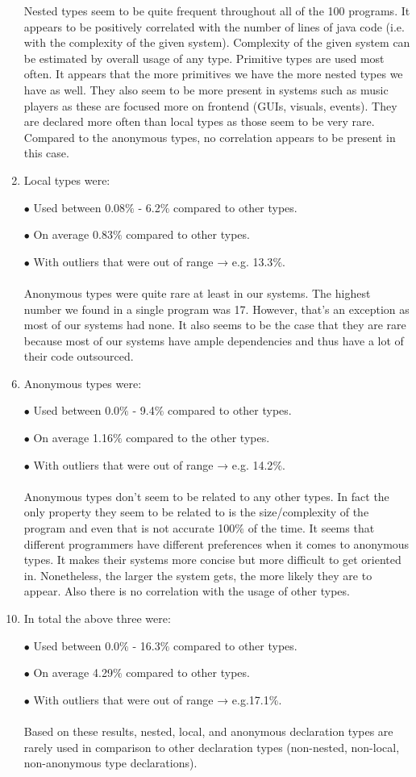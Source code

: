 \documentclass{assignment}
\begin{document}
\begin{enumerate}
	Nested types seem to be quite frequent throughout all of the 100 programs. It appears to be positively correlated with the number of lines of java code (i.e. with the complexity of the given system). Complexity of the given system can be estimated by overall usage of any type. Primitive types are used most often. It appears that the more primitives we have the more nested types we have as well. They also seem to be more present in systems such as music players as these are focused more on frontend (GUIs, visuals, events). They are declared more often than local types as those seem to be very rare. Compared to the anonymous types, no correlation appears to be present in this case. \\
\item Local types were:
\item[$\bullet$]Used between 0.08$\%$ - 6.2$\%$ compared to other types.
\item[$\bullet$]On average 0.83$\%$ compared to other types.
\item[$\bullet$]With outliers that were out of range → e.g. 13.3$\%$.\\
\\Anonymous types were quite rare at least in our systems. The highest number we found in a single program was 17. However, that’s an exception as most of our systems had none. It also seems to be the case that they are rare because most of our systems have ample dependencies and thus have a lot of their code outsourced.\\
\item Anonymous types were:
\item[$\bullet$]Used between 0.0$\%$ - 9.4$\%$ compared to other types.
\item[$\bullet$]On average 1.16$\%$ compared to the other types.
\item[$\bullet$]With outliers that were out of range → e.g. 14.2$\%$.\\
\\Anonymous types don’t seem to be related to any other types. In fact the only property they seem to be related to is the size/complexity of the program and even that is not accurate 100$\%$ of the time. It seems that different programmers have different preferences when it comes to anonymous types. It makes their systems more concise but more difficult to get oriented in. Nonetheless, the larger the system gets, the more likely they are to appear. Also there is no correlation with the usage of other types.\\
\item In total the above three were:
\item[$\bullet$]Used between 0.0$\%$ - 16.3$\%$ compared to other types.
\item[$\bullet$]On average 4.29$\%$ compared to other types.
\item[$\bullet$]With outliers that were out of range → e.g.17.1$\%$.\\
\\Based on these results, nested, local, and anonymous declaration types are rarely  used in comparison to other declaration types (non-nested, non-local, non-anonymous type declarations).\\


\end{enumerate}
\end{document}
